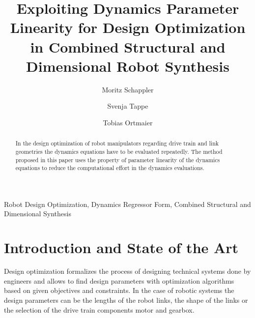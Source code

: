 \documentclass{svproc}
\begin{document}
    
\mainmatter              %
%
\title{Exploiting Dynamics Parameter Linearity for Design Optimization in Combined Structural and Dimensional Robot Synthesis}
%
%
\author{Moritz Schappler \and Svenja Tappe \and Tobias Ortmaier}
%
%
%

\maketitle              %


\begin{abstract}
In the design optimization of robot manipulators regarding drive train and link geometries the dynamics equations have to be evaluated repeatedly.
The method proposed in this paper uses the property of parameter linearity of the dynamics equations to reduce the computational effort in the dynamics evaluations.
\end{abstract}

\begin{keywords}
Robot Design Optimization, Dynamics Regressor Form, Combined Structural and Dimensional Synthesis
\end{keywords}

\section{Introduction and State of the Art}
\label{sec:Intro}


Design optimization formalizes the process of designing technical systems done by engineers and allows to find design parameters with optimization algorithms based on given objectives and constraints.
In the case of robotic systems the design parameters can be the lengths of the robot links, the shape of the links or the selection of the drive train components motor and gearbox.
\end{document}
